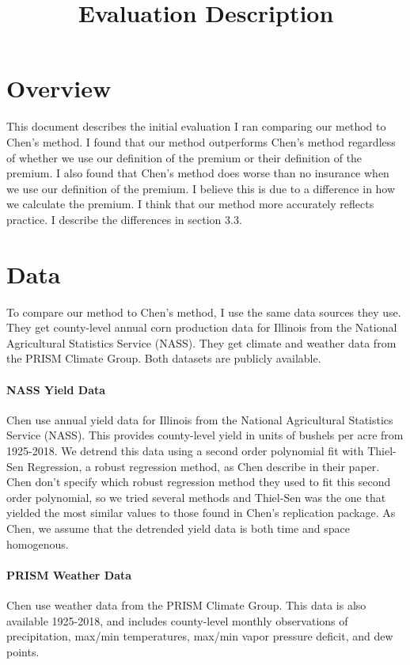 \documentclass[11pt]{article}
\title{Evaluation Description}
\begin{document}
\maketitle

\section{Overview}
  This document describes the initial evaluation I ran comparing our method to Chen's method. I found that our method outperforms Chen's method regardless of whether we use our definition of the premium or their definition of the premium. I also found that Chen's method does worse than no insurance when we use our definition of the premium. I believe this is due to a difference in how we calculate the premium. I think that our method more accurately reflects practice. I describe the differences in section 3.3. 

\section{Data}
  To compare our method to Chen's method, I use the same data sources they use. They get county-level annual corn production data for Illinois from the National Agricultural Statistics Service (NASS). They get climate and weather data from the PRISM Climate Group. Both datasets are publicly available. 

  \paragraph{NASS Yield Data} Chen use annual yield data for Illinois from the National Agricultural Statistics Service (NASS). This provides county-level yield in units of bushels per acre from 1925-2018. We detrend this data using a second order polynomial fit with Thiel-Sen Regression, a robust regression method, as Chen describe in their paper. Chen don't specify which robust regression method they used to fit this second order polynomial, so we tried several methods and Thiel-Sen was the one that yielded the most similar values to those found in Chen's replication package. As Chen, we assume that the detrended yield data is both time and space homogenous.

  \paragraph{PRISM Weather Data} Chen use weather data from the PRISM Climate Group. This data is also available 1925-2018, and includes county-level monthly observations of precipitation, max/min temperatures, max/min vapor pressure deficit, and dew points. 
\end{document}
